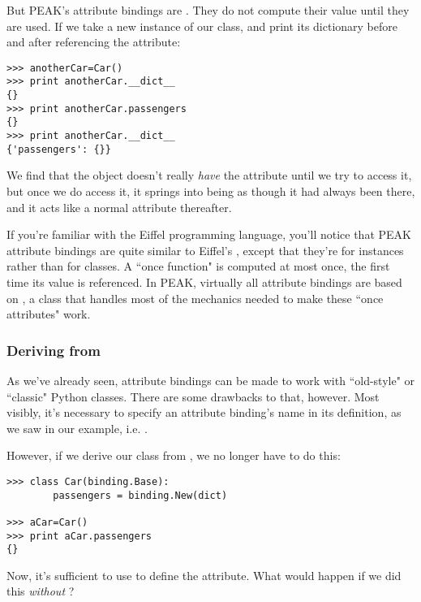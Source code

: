 But PEAK's attribute bindings are .  They do not compute their
value until they are used.  If we take a new instance of our 
class, and print its dictionary before and after referencing the 
 attribute:

\begin{verbatim}
>>> anotherCar=Car()
>>> print anotherCar.__dict__
{}
>>> print anotherCar.passengers
{}
>>> print anotherCar.__dict__
{'passengers': {}}

\end{verbatim}

We find that the object doesn't really \emph{have} the attribute until we
try to access it, but once we do access it, it springs into being as though
it had always been there, and it acts like a normal attribute thereafter.


If you're familiar with the Eiffel programming language, you'll notice that
PEAK attribute bindings are quite similar to Eiffel's ,
except that they're for instances rather than for classes.  A ``once function"
is computed at most once, the first time its value is referenced.  In PEAK,
virtually all attribute bindings are based on , a class
that handles most of the mechanics needed to make these ``once attributes" work.

\subsubsection{Deriving from }

As we've already seen, attribute bindings can be made to work with 
``old-style" or ``classic" Python classes.  There are some drawbacks to that,
however.  Most visibly, it's necessary to specify an attribute binding's
name in its definition, as we saw in our example, i.e. 
.

However, if we derive our class from , we no longer have
to do this:

\begin{verbatim}
>>> class Car(binding.Base):
        passengers = binding.New(dict)
	
>>> aCar=Car()
>>> print aCar.passengers
{}

\end{verbatim}

Now, it's sufficient to use  to define the attribute.
What would happen if we did this \emph{without} ?











